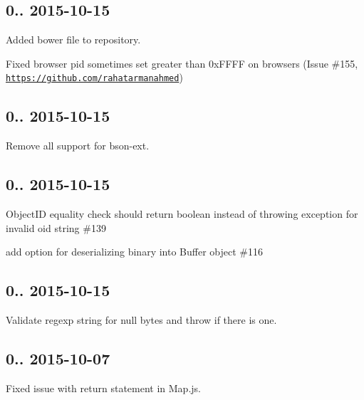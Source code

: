 \subsection*{0.. 2015-\/10-\/15 }


\begin{DoxyItemize}
\item Added bower file to repository.
\item Fixed browser pid sometimes set greater than 0x\+F\+F\+FF on browsers (Issue \#155, \href{https://github.com/rahatarmanahmed}{\tt https\+://github.\+com/rahatarmanahmed})
\end{DoxyItemize}

\subsection*{0.. 2015-\/10-\/15 }


\begin{DoxyItemize}
\item Remove all support for bson-\/ext.
\end{DoxyItemize}

\subsection*{0.. 2015-\/10-\/15 }


\begin{DoxyItemize}
\item Object\+ID equality check should return boolean instead of throwing exception for invalid oid string \#139
\item add option for deserializing binary into Buffer object \#116
\end{DoxyItemize}

\subsection*{0.. 2015-\/10-\/15 }


\begin{DoxyItemize}
\item Validate regexp string for null bytes and throw if there is one.
\end{DoxyItemize}

\subsection*{0.. 2015-\/10-\/07 }


\begin{DoxyItemize}
\item Fixed issue with return statement in Map.\+js.
\end{DoxyItemize}

